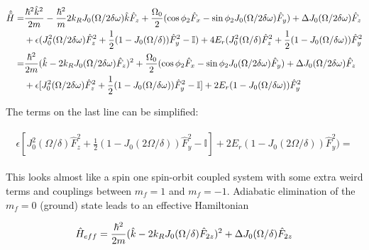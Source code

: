 \begin{align}
\begin{split}
\hat{\tilde{H}} = &\frac{\hbar^2\hat{k}^2}{2m} - \frac{\hbar^2}{m}2{{k_R}} J_0(\Omega/2\delta\omega)\hat{k}\hat{F}_z + \frac{\Omega_0}{2}(\cos\phi_2\hat{F}_x - \sin\phi_2J_0(\Omega/2\delta\omega)\hat{F}_y)+ \Delta J_0(\Omega/2\delta\omega)\hat{F}_z \\
				 &+\epsilon(J_0^2(\Omega/2\delta\omega)\hat{F}_z^2 + \frac{1}{2}(1-J_0(\Omega/\delta))\hat{F}_y^2-\mathbb{I})+4E_r(J_0^2(\Omega/\delta)\hat{F}_z^2 + \frac{1}{2}(1-J_0(\Omega/\delta\omega))\hat{F}_y^2\\
= & \frac{\hbar^2}{2m}(\hat{k}-2{{k_R}} J_0(\Omega/2\delta\omega)\hat{F}_z)^2 +\frac{\Omega_0}{2}(\cos\phi_2\hat{F}_x - \sin\phi_2J_0(\Omega/2\delta\omega)\hat{F}_y) + \Delta J_0(\Omega/2\delta\omega)\hat{F}_z \\
& + \epsilon[J_0^2(\Omega/2\delta\omega)\hat{F}_z^2 + \frac{1}{2}(1-J_0(\Omega/\delta\omega))\hat{F}_y^2-\mathbb{I}]+2E_r (1-J_0(\Omega/\delta\omega))\hat{F}_y^2
\end{split}
\end{align}


The terms on the last line can be simplified:

\begin{align}
\begin{split}
\epsilon[J_0^2(\Omega/\delta)\hat{F}_z^2 + \frac{1}{2}(1-J_0(2\Omega/\delta))\hat{F}_y^2-\mathbb{I}]+2E_r (1-J_0(2\Omega/\delta))\hat{F}_y^2) = 
\end{split}
\end{align}


This looks almost like a spin one spin-orbit coupled system with some extra weird terms and couplings between $m_f=1$ and $m_f= -1$. Adiabatic elimination of the $m_f=0$ (ground) state leads to an effective Hamiltonian

\begin{align}
\hat{H}_{eff} = \frac{\hbar^2}{2m}(\hat{k} - 2{{k_R}}     J_0(\Omega/\delta)\hat{F}_{2z})^2 + \Delta J_0(\Omega/\delta)\hat{F}_{2z}
\end{align}



